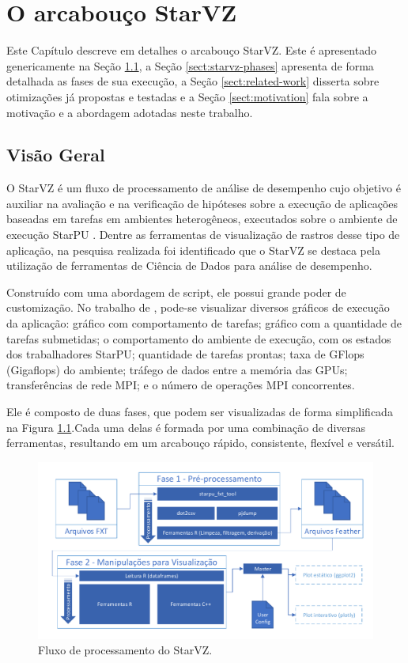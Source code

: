 \chapter{O arcabouço StarVZ} \label{ch:starvz}

Este Capítulo descreve em detalhes o arcabouço StarVZ. Este é 
apresentado genericamente na Seção \ref{sect:starvz-overview}, a Seção 
\ref{sect:starvz-phases} apresenta de forma detalhada as fases de sua 
execução, a Seção \ref{sect:related-work} disserta sobre otimizações já 
propostas e testadas e a Seção \ref{sect:motivation} fala sobre a motivação e a 
abordagem adotadas neste trabalho.

\section{Visão Geral}\label{sect:starvz-overview}

O StarVZ \cite{ref:starvz} é um fluxo de processamento de análise de desempenho 
cujo objetivo é auxiliar na avaliação e na verificação de hipóteses sobre a 
execução de aplicações baseadas em tarefas em ambientes heterogêneos, executados 
sobre o ambiente de execução StarPU \cite{ref:starpu}. Dentre as ferramentas de 
visualização de rastros desse tipo de aplicação, na pesquisa realizada foi 
identificado que o StarVZ se destaca pela utilização de ferramentas de 
Ciência de Dados para análise de desempenho.

Construído com uma abordagem de script, ele possui grande poder de customização. 
No trabalho de \citet{ref:starvz}, pode-se visualizar diversos gráficos de 
execução da aplicação: gráfico com comportamento de tarefas; gráfico com a 
quantidade de tarefas submetidas; o comportamento do ambiente de execução, com 
os estados dos trabalhadores StarPU; quantidade de tarefas prontas; 
taxa de GFlops (Gigaflops) do ambiente; tráfego de dados entre a memória das 
GPUs; transferências de rede MPI; e o número de operações MPI concorrentes.

Ele é composto de duas fases, que podem ser visualizadas de forma simplificada 
na Figura \ref{fig:starvz-workflow-general}.Cada uma delas é formada por uma 
combinação de diversas ferramentas, resultando em um arcabouço rápido, 
consistente, flexível e versátil.

\begin{figure}[H]
 \centerline{\includegraphics[width=1\textwidth]{./img/all-proc.pdf}}
 \caption{Fluxo de processamento do StarVZ.}
 \label{fig:starvz-workflow-general}
\end{figure}

